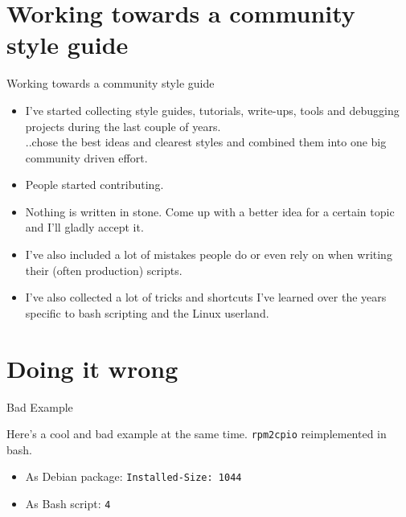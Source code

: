 \section{Working towards a community style
guide}\label{working-towards-a-community-style-guide}

\begin{frame}{Working towards a community style guide}

\begin{itemize}
\itemsep1pt\parskip0pt
\item
  I've started collecting style guides, tutorials, write-ups, tools and
  debugging projects during the last couple of years.\\ ..chose the best
  ideas and clearest styles and combined them into one big community
  driven effort.
\item
  People started contributing.
\item
  Nothing is written in stone. Come up with a better idea for a certain
  topic and I'll gladly accept it.
\item
  I've also included a lot of mistakes people do or even rely on when
  writing their (often production) scripts.
\item
  I've also collected a lot of tricks and shortcuts I've learned over
  the years specific to bash scripting and the Linux userland.
\end{itemize}

\end{frame}

\section{Doing it wrong}\label{doing-it-wrong}

\begin{frame}{Bad Example}

Here's a cool and bad example at the same time. \texttt{rpm2cpio}
reimplemented in bash.

\begin{itemize}
\itemsep1pt\parskip0pt
\item
  As Debian package: \texttt{Installed-Size: 1044}
\item
  As Bash script: \texttt{4}
\end{itemize}

\end{frame}

